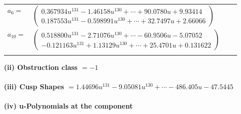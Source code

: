 \documentclass[1p]{elsarticle_modified}
\theoremstyle{definition}
\begin{document}
\begin{tabular}{m{7pt} m{180pt} m{7pt} m{180pt} }
\flushright $a_{6}=$&$\begin{pmatrix}0.367934 u^{131}-1.46158 u^{130}+\cdots+90.0780 u+9.93414\\0.187553 u^{131}-0.598991 u^{130}+\cdots+32.7497 u+2.66066\end{pmatrix}$ \\
\flushright $a_{10}=$&$\begin{pmatrix}0.518800 u^{131}-2.71076 u^{130}+\cdots-60.9506 u-5.07052\\-0.121163 u^{131}+1.13129 u^{130}+\cdots+25.4701 u+0.131622\end{pmatrix}$\\&\end{tabular}
\flushleft \textbf{(ii) Obstruction class $= -1$}\\~\\
\flushleft \textbf{(iii) Cusp Shapes $= 1.44696 u^{131}-9.05081 u^{130}+\cdots-486.405 u-47.5445$}\\~\\
\newpage\renewcommand{\arraystretch}{1}
\flushleft \textbf{(iv) u-Polynomials at the component}\newline \\
\end{document}
